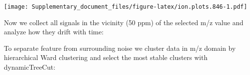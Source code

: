 \documentclass[]{article}
\newenvironment{Shaded}{\begin{snugshade}}{\end{snugshade}}
\newcommand{\KeywordTok}[1]{\textcolor[rgb]{0.13,0.29,0.53}{\textbf{#1}}}
\newcommand{\FloatTok}[1]{\textcolor[rgb]{0.00,0.00,0.81}{#1}}
\newcommand{\StringTok}[1]{\textcolor[rgb]{0.31,0.60,0.02}{#1}}
\newcommand{\OperatorTok}[1]{\textcolor[rgb]{0.81,0.36,0.00}{\textbf{#1}}}
\newcommand{\NormalTok}[1]{#1}
\begin{document}
\texttt{[image: Supplementary\_document\_files/figure-latex/ion.plots.846-1.pdf]}

Now we collect all signals in the vicinity (50 ppm) of the selected m/z
value and analyze how they drift with time:

\begin{Shaded}
\end{Shaded}

To separate feature from surrounding noise we cluster data in m/z domain
by hierarchical Ward clustering and select the most stable clusters with
dynamicTreeCut:
\end{document}
